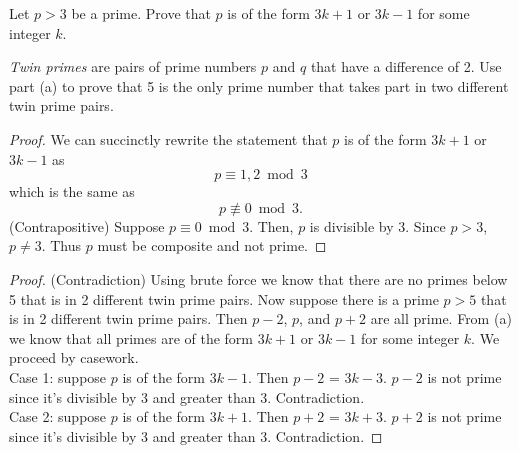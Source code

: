 \documentclass[11pt]{article}
\begin{document}
\begin{Parts}
	\item Let $p > 3$ be a prime. Prove that $p$ is of the form $3k + 1$ or $3k-1$ for some integer $k$.

	\item \textit{Twin primes} are pairs of prime numbers $p$ and $q$ that have a difference of 2. Use part (a) to prove that 5 is the only prime number that takes part in two different twin prime pairs.
\end{Parts}
\begin{solution}
\begin{Parts}

\Part \begin{proof}
We can succinctly rewrite the statement that $p$ is of the form $3k+1$ or $3k-1$
as $$p\equiv1,2\bmod3$$ which is the same as
$$p\not\equiv0\bmod3.$$
(Contrapositive) Suppose $p\equiv0\bmod3$. Then, $p$ is divisible by 3. 
Since $p > 3$, $p\neq3$. Thus $p$ must be composite and not prime.  
\end{proof}

\Part \begin{proof}
(Contradiction) Using brute force we know that there are no primes below 5 that is in 2 different twin prime pairs. 
Now suppose there is a prime $p>5$ that is in 2 different twin prime pairs.
Then $p-2$, $p$, and $p+2$ are all prime.
From (a) we know that all primes are of the form $3k+1$ or $3k-1$ for some integer $k$.
We proceed by casework.
\\Case 1: suppose $p$ is of the form $3k-1$. 
Then $p-2$ = $3k-3$. $p-2$ is not prime since it's divisible by 3 and greater than 3.
Contradiction.
\\Case 2: suppose $p$ is of the form $3k+1$.
Then $p+2$ = $3k+3$. $p+2$ is not prime since it's divisible by 3 and greater than 3.
Contradiction.
\end{proof}

\end{Parts}
\end{solution}
\end{document}
